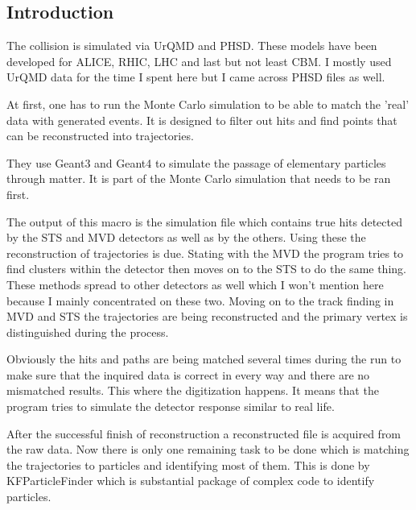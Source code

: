 \documentclass[a4paper,12pt]{article}
\begin{document}
\subsection{ Introduction}
\vspace{5mm}
\par The collision is simulated via UrQMD and PHSD. These models have been developed for ALICE, RHIC, LHC and last but not least CBM. I mostly used UrQMD data for the time I spent here but I came across PHSD files as well.
\vspace{5mm}
\par At first, one has to run the Monte Carlo simulation to be able to match the 'real' data with generated events. It is designed to filter out hits and find points that can be reconstructed into trajectories.
\vspace{5mm}
\par They use Geant3 and Geant4 to simulate the passage of elementary particles through matter. It is part of the Monte Carlo simulation that needs to be ran first.
\vspace{5mm}
\par The output of this macro is the simulation file which contains true hits detected by the STS and MVD detectors as well as by the others. Using these the reconstruction of trajectories is due. Stating with the MVD the program tries to find clusters within the detector then moves on to the STS to do the same thing. These methods spread to other detectors as well which I won't mention here because I mainly concentrated on these two. Moving on to the track finding in MVD and STS the trajectories are being reconstructed and the primary vertex is distinguished during the process. 
\vspace{5mm}
\par Obviously the hits and paths are being matched several times during the run to make sure that the inquired data is correct in every way and there are no mismatched results. This where the digitization happens. It means that the program tries to simulate the detector response similar to real life.
\vspace{5mm}
\par After the successful finish of reconstruction a reconstructed file is acquired from the raw data. Now there is only one remaining task to be done which is matching the trajectories to particles and identifying most of them. This is done by KFParticleFinder which is substantial package of complex code to identify particles.
\vspace{5mm}
\end{document}
